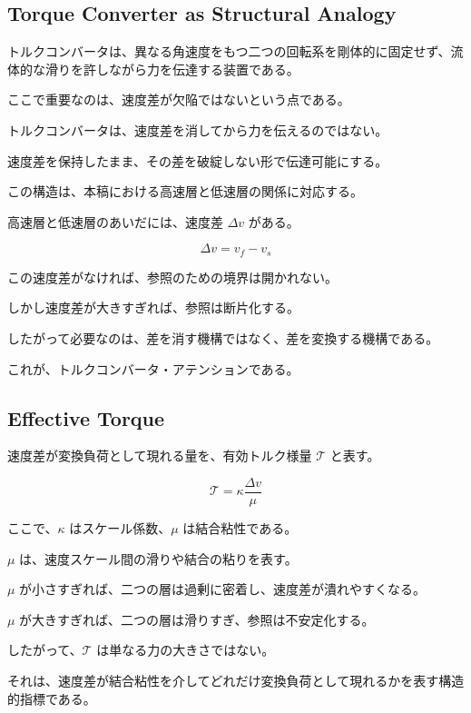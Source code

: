 \subsection{Torque Converter as Structural Analogy}

トルクコンバータは、異なる角速度をもつ二つの回転系を剛体的に固定せず、流体的な滑りを許しながら力を伝達する装置である。

ここで重要なのは、速度差が欠陥ではないという点である。

トルクコンバータは、速度差を消してから力を伝えるのではない。

速度差を保持したまま、その差を破綻しない形で伝達可能にする。

この構造は、本稿における高速層と低速層の関係に対応する。

高速層と低速層のあいだには、速度差 $\Delta v$ がある。

\begin{equation}
\Delta v = v_f - v_s
\end{equation}

この速度差がなければ、参照のための境界は開かれない。

しかし速度差が大きすぎれば、参照は断片化する。

したがって必要なのは、差を消す機構ではなく、差を変換する機構である。

これが、トルクコンバータ・アテンションである。

\subsection{Effective Torque}

速度差が変換負荷として現れる量を、有効トルク様量 $\mathcal{T}$ と表す。

\begin{equation}
\mathcal{T}
=
\kappa
\frac{\Delta v}{\mu}
\end{equation}

ここで、$\kappa$ はスケール係数、$\mu$ は結合粘性である。

$\mu$ は、速度スケール間の滑りや結合の粘りを表す。

$\mu$ が小さすぎれば、二つの層は過剰に密着し、速度差が潰れやすくなる。

$\mu$ が大きすぎれば、二つの層は滑りすぎ、参照は不安定化する。

したがって、$\mathcal{T}$ は単なる力の大きさではない。

それは、速度差が結合粘性を介してどれだけ変換負荷として現れるかを表す構造的指標である。

